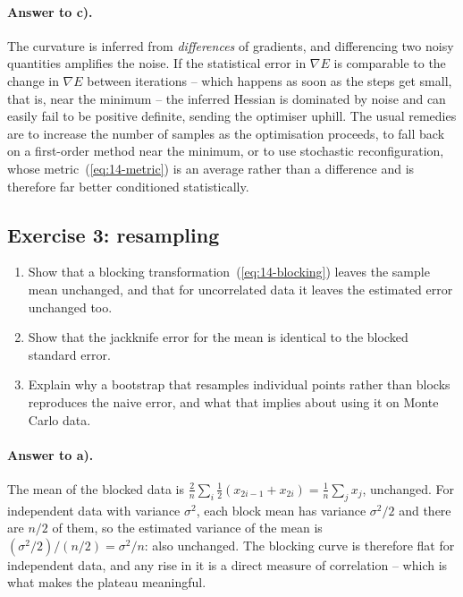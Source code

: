 \paragraph{Answer to c).}
The curvature is inferred from \emph{differences} of gradients, and
differencing two noisy quantities amplifies the noise.  If the statistical
error in $\nabla E$ is comparable to the change in $\nabla E$ between
iterations -- which happens as soon as the steps get small, that is, near the
minimum -- the inferred Hessian is dominated by noise and can easily fail to
be positive definite, sending the optimiser uphill.  The usual remedies are
to increase the number of samples as the optimisation proceeds, to fall back
on a first-order method near the minimum, or to use stochastic
reconfiguration, whose metric~(\ref{eq:14-metric}) is an average rather than a
difference and is therefore far better conditioned statistically.

\subsection*{Exercise 3: resampling}
\label{ex:14-resampling}

\begin{enumerate}
  \item[a)] Show that a blocking transformation~(\ref{eq:14-blocking}) leaves
  the sample mean unchanged, and that for uncorrelated data it leaves the
  estimated error unchanged too.
  \item[b)] Show that the jackknife error for the mean is identical to the
  blocked standard error.
  \item[c)] Explain why a bootstrap that resamples individual points rather
  than blocks reproduces the naive error, and what that implies about using it
  on Monte Carlo data.
\end{enumerate}

\paragraph{Answer to a).}
The mean of the blocked data is
$\frac{2}{n}\sum_i\frac12(x_{2i-1}+x_{2i})=\frac1n\sum_j x_j$, unchanged.  For
independent data with variance $\sigma^2$, each block mean has variance
$\sigma^2/2$ and there are $n/2$ of them, so the estimated variance of the
mean is $(\sigma^2/2)/(n/2)=\sigma^2/n$: also unchanged.  The blocking curve
is therefore flat for independent data, and any rise in it is a direct measure
of correlation -- which is what makes the plateau meaningful.


